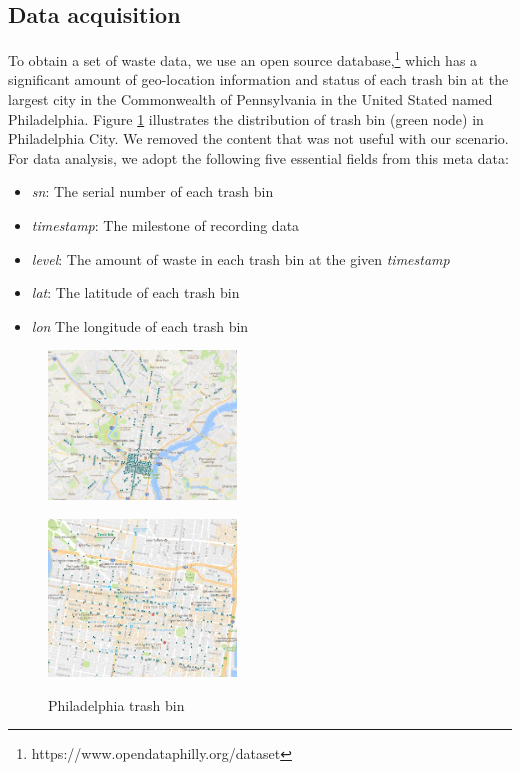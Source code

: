 \documentclass[conference]{IEEEtran}
\begin{document}
\subsection{Data acquisition} 
\par To obtain a set of waste data, we use an open source database,\footnote{https://www.opendataphilly.org/dataset} which has a significant amount of geo-location information and status of each trash bin at the largest city in the Commonwealth of Pennsylvania in the United Stated named Philadelphia. Figure \ref{Philadelphia} illustrates the distribution of trash bin (green node) in Philadelphia City. We removed the content that was not useful with our scenario. For data analysis, we adopt the following five essential fields from this meta data:
\begin{itemize}
	\item \textit{sn}: The serial number of each trash bin
	\item \textit{timestamp}: The milestone of recording data
	\item \textit{level}: The amount of waste in each trash bin at the given \textit{timestamp}
	\item \textit{lat}: The latitude of each trash bin
	\item \textit{lon} The longitude of each trash bin
\end{itemize}

\begin{figure}
	\centering
	\parbox{5cm}{
		\includegraphics[width=5cm]{overview1}
		\label{fig1a}}
	\qquad
	\begin{minipage}{5cm}
		\includegraphics[width=5cm]{overview3}
		\label{fig1b}
	\end{minipage}
	\caption{Philadelphia trash bin}
	\label{Philadelphia}
\end{figure}
\end{document}
